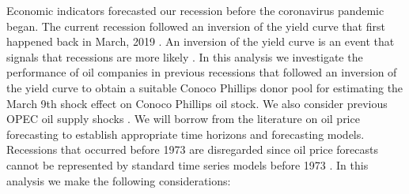 \documentclass[11pt]{article}
\theoremstyle{definition}
\begin{document}
Economic indicators forecasted our recession before the coronavirus pandemic began. The current recession followed an inversion of the yield curve that first happened back in March, 2019 \citep{tokic2019yield}. An inversion of the yield curve is an event that signals that recessions are more likely \citep{andolfatto2018yield, bauer2018economic}. In this analysis we investigate the performance of oil companies in previous recessions that followed an inversion of the yield curve to obtain a suitable Conoco Phillips donor pool for estimating the March 9th shock effect on Conoco Phillips oil stock. We also consider previous OPEC oil supply shocks \citep{mensi2014opec}. We will borrow from the literature on oil price forecasting to establish appropriate time horizons and forecasting models. Recessions that occurred before 1973 are disregarded since oil price forecasts cannot be represented by standard time series models before 1973 \citep{alquist2013forecasting}. In this analysis we make the following considerations:
\end{document}
